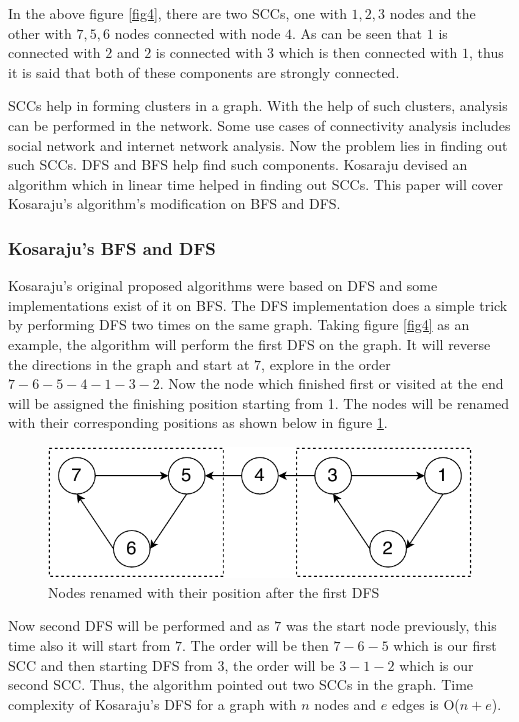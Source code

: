 \documentclass[journal,twoside,web]{ieeecolor}
\begin{document}
In the above figure \ref{fig4}, there are two SCCs, one with {$1, 2, 3$} nodes and the other with {$7, 5, 6$} nodes connected with node $4$. As can be seen that $1$ is connected with $2$ and $2$ is connected with $3$ which is then connected with $1$, thus it is said that both of these components are strongly connected.

SCCs help in forming clusters in a graph. With the help of such clusters, analysis can be performed in the network. Some use cases of connectivity analysis includes social network and internet network analysis. Now the problem lies in finding out such SCCs. DFS and BFS help find such components. Kosaraju devised an algorithm which in linear time helped in finding out SCCs\cite{40}. This paper will cover Kosaraju's algorithm's modification on BFS and DFS.

\subsubsection{Kosaraju's BFS and DFS}
Kosaraju's original proposed algorithms were based on DFS and some implementations exist of it on BFS. The DFS implementation does a simple trick by performing DFS two times on the same graph. Taking figure \ref{fig4} as an example, the algorithm will perform the first DFS on the graph. It will reverse the directions in the graph and start at $7$, explore in the order $7-6-5-4-1-3-2$. Now the node which finished first or visited at the end will be assigned the finishing position starting from 1. The nodes will be renamed with their corresponding positions as shown below in figure \ref{fig5}. 

\begin{figure}[!h]
    \centerline{\includegraphics[scale=0.75]{figures/scc2.pdf}}
    \caption{Nodes renamed with their position after the first DFS}
    \label{fig5}
\end{figure}

Now second DFS will be performed and as $7$ was the start node previously, this time also it will start from $7$. The order will be then $7-6-5$ which is our first SCC and then starting DFS from $3$, the order will be $3-1-2$ which is our second SCC. Thus, the algorithm pointed out two SCCs in the graph. Time complexity of Kosaraju’s DFS for a graph with $n$ nodes and $e$ edges is O($n + e$).
\end{document}
